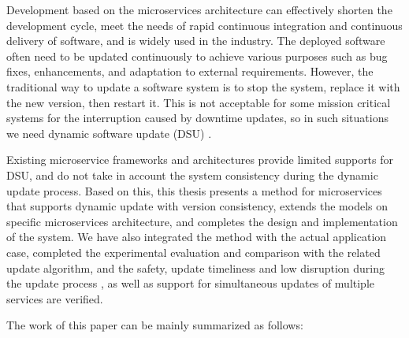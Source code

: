 \documentclass[macfonts,master]{njuthesis}
\begin{document}
\begin{englishabstract}
Development based on the microservices architecture can effectively shorten the development cycle, meet the needs of rapid continuous integration and continuous delivery of software, and is widely used in the industry. The deployed software often need to be updated continuously to achieve various purposes such as bug fixes, enhancements, and adaptation to external requirements. However, the traditional way to update a software system is to stop the system, replace it with the new version, then restart it. This is not acceptable for some mission critical systems for the interruption caused by downtime updates, so in such situations we need dynamic software update (DSU) .

Existing microservice frameworks and architectures provide limited supports for DSU, and do not take in account the system consistency during the dynamic update process. Based on this, this thesis presents a method for microservices that supports dynamic update with version consistency, extends the models on specific microservices architecture, and completes the design and implementation of the system. We have also integrated the method with the actual application case, completed the experimental evaluation and comparison with the related update algorithm, and the safety, update timeliness and low disruption during the update process , as well as support for simultaneous updates of multiple services are verified. 

The work of this paper can be mainly summarized as follows: 


\end{englishabstract}
\end{document}

